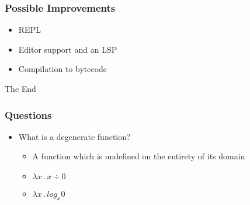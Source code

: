 \documentclass{beamer}
\begin{document}
\begin{frame}
    \frametitle{Possible Improvements}
    \begin{itemize}
        \item REPL
        \item Editor support and an LSP
        \item Compilation to bytecode
    \end{itemize}
\end{frame}

\begin{frame}
    \begin{center}
        \Huge The End
    \end{center}
\end{frame}

\begin{frame}
    \frametitle{Questions}
    \begin{itemize}
        \item What is a degenerate function?
            \begin{itemize}
                \item A function which is undefined on the entirety of its domain
                \item $\lambda x \, . \, x \div 0$
                \item $\lambda x \, . \, log_x 0$
            \end{itemize}
    \end{itemize}
\end{frame}
\end{document}
